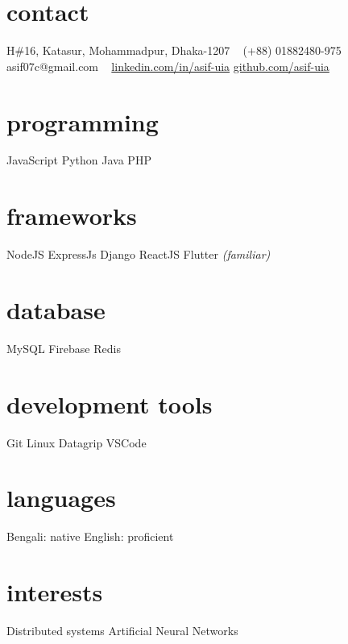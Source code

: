 \documentclass[print]{exponential-cv} %
\begin{document}

\begin{aside}
	\section{contact}
	H\#16, Katasur, Mohammadpur, Dhaka-1207
	~
	(+88) 01882480-975
	asif07c@gmail.com
	~
	\href{https://linkedin.com/in/asif-uia}{linkedin.com/in/asif-uia}
	\href{https://github.com/asif-uia}{github.com/asif-uia}
	~
	\section{programming}
	JavaScript
	Python
	Java
	PHP
	~
	\section{frameworks}
	NodeJS
	ExpressJs
	Django
	ReactJS
	Flutter \emph{(familiar)}
	~
	\section{database}
	MySQL
	Firebase
	Redis
	~
	\section{development tools}
	Git
	Linux
	Datagrip
	VSCode
	~
	\section{languages}
	Bengali: native
	English: proficient
	~
	\section{interests}
	Distributed systems
	Artificial Neural Networks
\end{aside}






\end{document}
